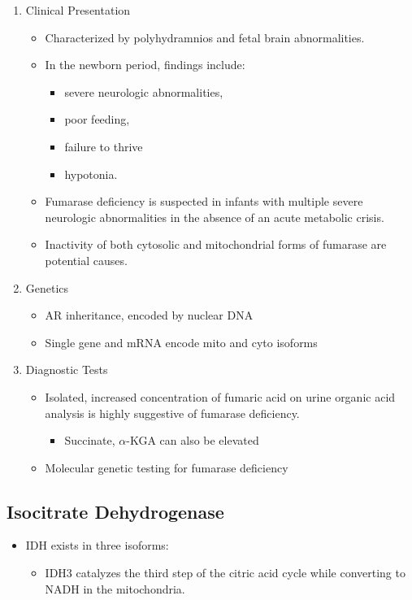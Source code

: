\documentclass{scrartcl}
\begin{document}
\begin{enumerate}
\item Clinical Presentation
\label{sec:org9b22ee7}
\begin{itemize}
\item Characterized by polyhydramnios and fetal brain abnormalities.
\item In the newborn period, findings include:
\begin{itemize}
\item severe neurologic abnormalities,
\item poor feeding,
\item failure to thrive
\item hypotonia.
\end{itemize}
\item Fumarase deficiency is suspected in infants with multiple severe
neurologic abnormalities in the absence of an acute metabolic
crisis.
\item Inactivity of both cytosolic and mitochondrial forms of
fumarase are potential causes.
\end{itemize}
\item Genetics
\label{sec:org894f4fe}
\begin{itemize}
\item AR inheritance, encoded by nuclear DNA
\item Single gene and mRNA encode mito and cyto isoforms
\end{itemize}
\item Diagnostic Tests
\label{sec:org243fa2d}
\begin{itemize}
\item Isolated, increased concentration of fumaric acid on urine organic
acid analysis is highly suggestive of fumarase deficiency.
\begin{itemize}
\item Succinate, \(\alpha\)-KGA can also be elevated
\end{itemize}
\item Molecular genetic testing for fumarase deficiency
\end{itemize}
\end{enumerate}
\subsection{Isocitrate Dehydrogenase}
\label{sec:org08ad925}
\begin{itemize}
\item IDH exists in three isoforms:
\begin{itemize}
\item IDH3 catalyzes the third step of the citric acid cycle while converting  to NADH in the mitochondria.
\end{itemize}
\end{itemize}
\end{document}
